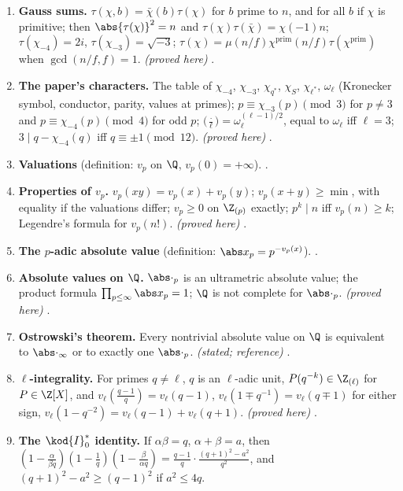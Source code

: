 \begin{enumerate}[label=\textbf{\thechapter.\arabic*}]
\item \textbf{Gauss sums.} $\tau(\chi,b)=\bar\chi(b)\tau(\chi)$ for $b$ prime to $n$, and for all $b$ if $\chi$ is primitive; then $\abs{\tau(\chi)}^2=n$
and $\tau(\chi)\tau(\bar\chi)=\chi(-1)n$; $\tau(\chi_{-4})=2i$, $\tau(\chi_{-3})=\sqrt{-3}$; $\tau(\chi)=\mu(n/f)\chi^{\mathrm{prim}}(n/f)\tau(\chi^{\mathrm{prim}})$ when
$\gcd(n/f,f)=1$. \emph{(proved here)} .
\item \textbf{The paper's characters.} The table of $\chi_{-4}$, $\chi_{-3}$, $\chi_{q^*}$, $\chi_S$, $\chi_{\ell^*}$, $\omega_\ell$ (Kronecker symbol,
conductor, parity, values at primes); $p\equiv\chi_{-3}(p)\pmod3$ for $p\ne3$ and $p\equiv\chi_{-4}(p)\pmod4$ for odd $p$;
$\bigl(\frac\cdot\ell\bigr)=\omega_\ell^{(\ell-1)/2}$, equal to $\omega_\ell$ iff $\ell=3$; $3\mid q-\chi_{-4}(q)$ iff $q\equiv\pm1\pmod{12}$. \emph{(proved here)}
.
\item \textbf{Valuations} (definition: $v_p$ on $\Q$, $v_p(0)=+\infty$). .
\item \textbf{Properties of $v_p$.} $v_p(xy)=v_p(x)+v_p(y)$; $v_p(x+y)\ge\min$, with equality if the valuations differ; $v_p\ge0$ on
$\Z_{(p)}$ exactly; $p^k\mid n$ iff $v_p(n)\ge k$; Legendre's formula for $v_p(n!)$. \emph{(proved here)} .
\item \textbf{The $p$-adic absolute value} (definition: $\abs x_p=p^{-v_p(x)}$). .
\item \textbf{Absolute values on $\Q$.} $\abs\cdot_p$ is an ultrametric absolute value; the product formula $\prod_{p\le\infty}\abs x_p=1$;
$\Q$ is not complete for $\abs\cdot_p$. \emph{(proved here)} .
\item \textbf{Ostrowski's theorem.} Every nontrivial absolute value on $\Q$ is equivalent to $\abs\cdot_\infty$ or to exactly one
$\abs\cdot_p$. \emph{(stated; reference)} .
\item \textbf{$\ell$-integrality.} For primes $q\ne\ell$, $q$ is an $\ell$-adic unit, $P(q^{-k})\in\Z_{(\ell)}$ for $P\in\Z[X]$, and
$v_\ell(\frac{q-1}q)=v_\ell(q-1)$, $v_\ell(1\mp q^{-1})=v_\ell(q\mp1)$ for either sign, $v_\ell(1-q^{-2})=v_\ell(q-1)+v_\ell(q+1)$. \emph{(proved here)}
.
\item \textbf{The $\kod{I}_0^*$ identity.} If $\alpha\beta=q$, $\alpha+\beta=a$, then
$(1-\frac\alpha{\beta q})(1-\frac1q)(1-\frac\beta{\alpha q})=\frac{q-1}q\cdot\frac{(q+1)^2-a^2}{q^2}$, and $(q+1)^2-a^2\ge(q-1)^2$ if $a^2\le4q$.

\end{enumerate}
